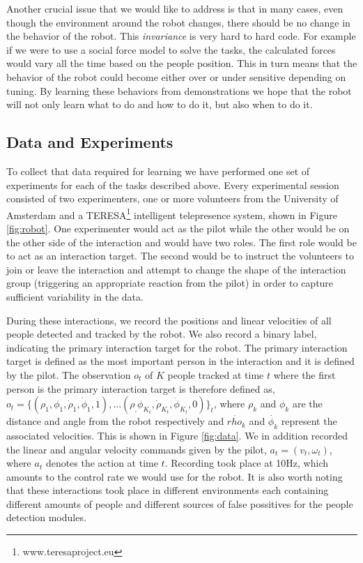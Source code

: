 \documentclass[letterpaper, 10 pt, conference]{ieeeconf}
\begin{document}
Another crucial issue that we would like to address is that in many cases, even though the environment around the robot changes, there should be no change in the behavior of the robot. This \emph{invariance} is very hard to hard code. For example if we were to use a social force model to solve the tasks, the calculated forces would vary all the time based on the people position. This in turn means that the behavior of the robot could become either over or under sensitive depending on tuning. By learning these behaviors from demonstrations we hope that the robot will not only learn what to do and how to do it, but also when to do it.


\subsection{Data and Experiments \label{subsec:data_exp}} 

To collect that data required for learning we have performed one set of experiments for each of the tasks described above. Every experimental session consisted of two experimenters, one or more volunteers from the University of Amsterdam and a TERESA\footnote{www.teresaproject.eu} intelligent telepresence system, shown in Figure \ref{fig:robot}.  One experimenter would act as the pilot while the other would be on the other side of the interaction and would have two roles. The first role would be to act as an interaction target. The second would be to instruct the volunteers to join or leave the interaction and attempt to change the shape of the interaction group (triggering an appropriate reaction from the pilot) in order to capture sufficient variability in the data.  

During these interactions, we record the positions and linear velocities of all people detected and tracked by the robot. We also record a binary label, indicating the primary interaction target for the robot. The primary interaction target is defined as the most important person in the interaction and it is defined by the pilot. The observation $o_t$ of $K$ people tracked at time $t$ where the first person is the primary interaction target is therefore defined as, $o_t = \{(\rho_1,\phi_1,\dot{\rho}_1,\dot{\phi}_1,1),... (\rho_,\phi_{K_t},\dot{\rho}_{K_t},\dot{\phi}_{K_t},0)\}_t$, where $\rho_k$ and $\phi_k$ are the distance and angle from the robot respectively and $\dot{rho_k}$ and $\dot{\phi_k}$ represent the associated velocities. This is shown in Figure \ref{fig:data}. We in addition recorded the linear and angular velocity commands given by the pilot, $a_t = (v_t,\omega_t)$, where $a_t$ denotes the action at time $t$. Recording took place at 10Hz, which amounts to the control rate we would use for the robot.  It is also worth noting that these interactions took place in different environments each containing different amounts of people and different sources of false possitives for the people detection modules.
\end{document}
